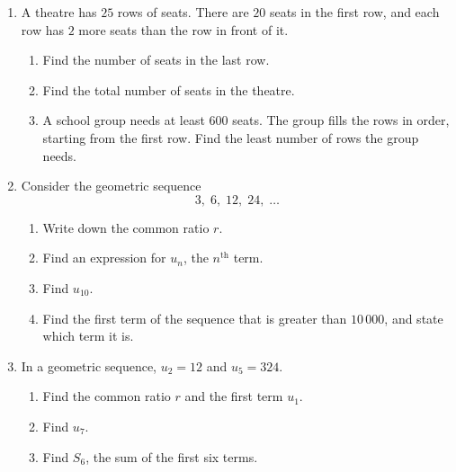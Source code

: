 \documentclass[12pt, twoside]{article}
\begin{document}
\begin{enumerate}[itemsep=0.15cm]
\item[4.]
A theatre has $25$ rows of seats. There are $20$ seats in the first row,
and each row has $2$ more seats than the row in front of it.

\begin{enumerate}[itemsep=0.1cm]
  \item Find the number of seats in the last row. \vfill
  \item Find the total number of seats in the theatre. \vfill
  \item A school group needs at least $600$ seats. The group fills the
  rows in order, starting from the first row. Find the least number of
  rows the group needs. \vfill
\end{enumerate}

\newpage

\item[5.]
Consider the geometric sequence
$$3,\; 6,\; 12,\; 24,\; \ldots$$

\begin{enumerate}[itemsep=0.1cm]
  \item Write down the common ratio $r$. \vfill
  \item Find an expression for $u_{n}$, the $n^{\text{th}}$ term. \vfill
  \item Find $u_{10}$. \vfill
  \item Find the first term of the sequence that is greater than
  $10\,000$, and state which term it is. \vfill
\end{enumerate}

\item[6.]
In a geometric sequence, $u_{2} = 12$ and $u_{5} = 324$.

\begin{enumerate}[itemsep=0.1cm]
  \item Find the common ratio $r$ and the first term $u_{1}$. \vfill
  \item Find $u_{7}$. \vfill
  \item Find $S_{6}$, the sum of the first six terms. \vfill
\end{enumerate}


\end{enumerate}
\end{document}
